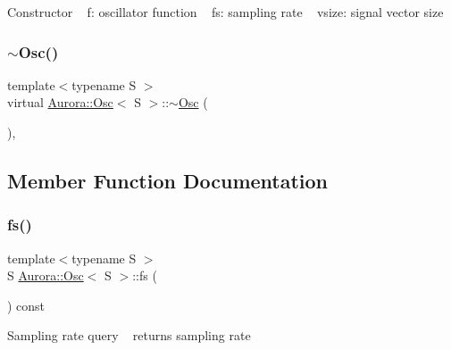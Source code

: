 Constructor ~\newline
f\+: oscillator function ~\newline
fs\+: sampling rate ~\newline
vsize\+: signal vector size \mbox{\label{class_aurora_1_1_osc_a95062ac1670f5de00a27c33bfb4eb117}} 
\subsubsection{\texorpdfstring{$\sim$\+Osc()}{~Osc()}}
{\footnotesize\ttfamily template$<$typename S $>$ \\
virtual \hyperlink{class_aurora_1_1_osc}{Aurora\+::\+Osc}$<$ S $>$\+::$\sim$\hyperlink{class_aurora_1_1_osc}{Osc} (\begin{DoxyParamCaption}{ }\end{DoxyParamCaption})\hspace{0.3cm}{\ttfamily [inline]}, {\ttfamily [virtual]}}



\subsection{Member Function Documentation}
\mbox{\label{class_aurora_1_1_osc_a9ac3aa9006fc98588b2163e0e56f6e30}} 
\subsubsection{\texorpdfstring{fs()}{fs()}}
{\footnotesize\ttfamily template$<$typename S $>$ \\
S \hyperlink{class_aurora_1_1_osc}{Aurora\+::\+Osc}$<$ S $>$\+::fs (\begin{DoxyParamCaption}{ }\end{DoxyParamCaption}) const\hspace{0.3cm}{\ttfamily [inline]}}

Sampling rate query ~\newline
returns sampling rate \mbox{\label{class_aurora_1_1_osc_a3e20a4f476e10209533a25d2abfc2af8}} 
